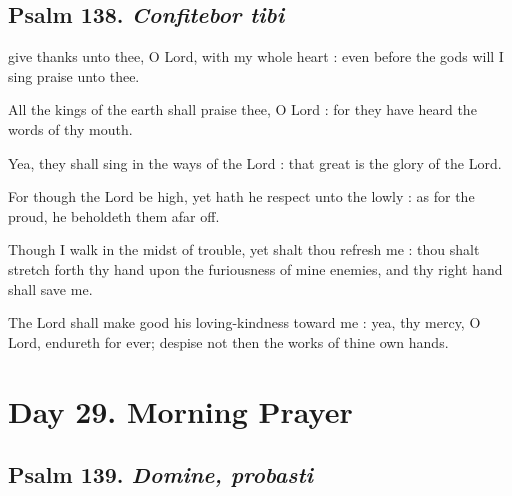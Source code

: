 \vspace{-0.25\baselineskip}

\subsection{Psalm 138. \textit{Confitebor tibi}}

 give thanks unto thee, O Lord, with my whole heart : even before the gods will I sing praise unto thee.\par
{}
All the kings of the earth shall praise thee, O Lord : for they have heard the words of thy mouth.\par
{}Yea, they shall sing in the ways of the Lord : that great is the glory of the Lord.\par
{}For though the Lord be high, yet hath he respect unto the lowly : as for the proud, he beholdeth them afar off.\par
{}Though I walk in the midst of trouble, yet shalt thou refresh me : thou shalt stretch forth thy hand upon the furiousness of mine enemies, and thy right hand shall save me.\par
{}The Lord shall make good his loving-kindness toward me : yea, thy mercy, O Lord, endureth for ever; despise not then the works of thine own hands.\par

\clearpage
\section*{Day 29. Morning Prayer}

\subsection{Psalm 139. \textit{Domine, probasti}}

